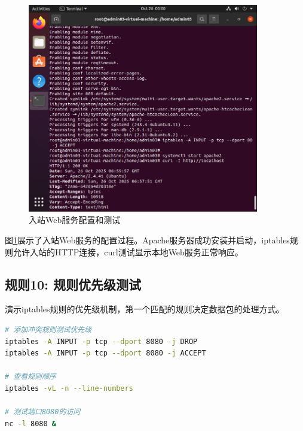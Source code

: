 \documentclass[12pt,a4paper]{article}
\begin{document}
\begin{figure}[H]
    \centering
    \includegraphics[width=0.9\textwidth]{10_inbound_web.png}
    \caption{入站Web服务配置和测试}
    \label{fig:inbound_web}
\end{figure}

图\ref{fig:inbound_web}展示了入站Web服务的配置过程。Apache服务器成功安装并启动，iptables规则允许入站的HTTP连接，curl测试显示本地Web服务正常响应。

\subsection{规则10: 规则优先级测试}

演示iptables规则的优先级机制，第一个匹配的规则决定数据包的处理方式。

\begin{lstlisting}[language=bash, caption=规则优先级测试]
# 添加冲突规则测试优先级
iptables -A INPUT -p tcp --dport 8080 -j DROP
iptables -A INPUT -p tcp --dport 8080 -j ACCEPT

# 查看规则顺序
iptables -vL -n --line-numbers

# 测试端口8080的访问
nc -l 8080 &
\end{lstlisting}
\end{document}
